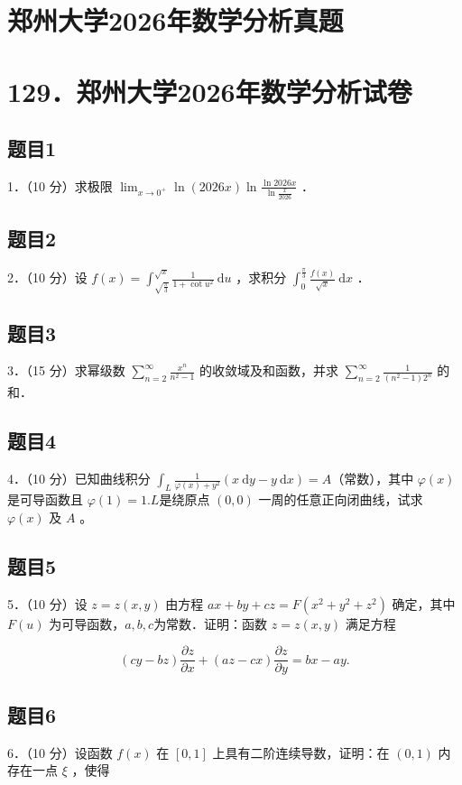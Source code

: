 \documentclass{article}
\begin{document}
\section*{郑州大学2026年数学分析真题}
\section*{129．郑州大学2026年数学分析试卷}

\subsection{题目1}
1．（10 分）求极限 \(\lim _{x \rightarrow 0^{+}} \ln (2026 x) \ln \frac{\ln 2026 x}{\ln \frac{x}{2026}}\) ．

\subsection{题目2}
2．（10 分）设 \(f(x)=\int_{\sqrt{\frac{\pi}{3}}}^{\sqrt{x}} \frac{1}{1+\cot u^{2}} \mathrm{~d} u\) ，求积分 \(\int_{0}^{\frac{\pi}{3}} \frac{f(x)}{\sqrt{x}} \mathrm{~d} x\) ．

\subsection{题目3}
3．（15 分）求幂级数 \(\sum_{n=2}^{\infty} \frac{x^{n}}{n^{2}-1}\) 的收敛域及和函数，并求 \(\sum_{n=2}^{\infty} \frac{1}{\left(n^{2}-1\right) 2^{n}}\) 的和．

\subsection{题目4}
4．（10 分）已知曲线积分 \(\int_{L} \frac{1}{\varphi(x)+y^{2}}(x \mathrm{~d} y-y \mathrm{~d} x)=A\)（常数），其中 \(\varphi(x)\) 是可导函数且 \(\varphi(1)=1 . L\)是绕原点 \((0,0)\) 一周的任意正向闭曲线，试求 \(\varphi(x)\) 及 \(A\) 。

\subsection{题目5}
5．（10 分）设 \(z=z(x, y)\) 由方程 \(a x+b y+c z=F\left(x^{2}+y^{2}+z^{2}\right)\) 确定，其中 \(F(u)\) 为可导函数，\(a, b, c\)为常数．证明：函数 \(z=z(x, y)\) 满足方程

\[
(c y-b z) \frac{\partial z}{\partial x}+(a z-c x) \frac{\partial z}{\partial y}=b x-a y .
\]

\subsection{题目6}
6．（10 分）设函数 \(f(x)\) 在 \([0,1]\) 上具有二阶连续导数，证明：在 \((0,1)\) 内存在一点 \(\xi\) ，使得
\end{document}
